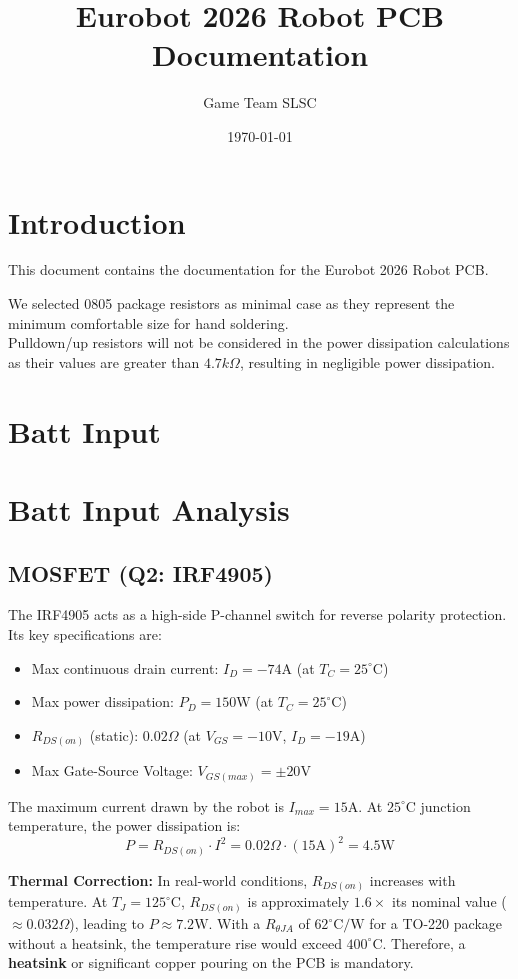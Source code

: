 \documentclass{article}
\title{Eurobot 2026 Robot PCB Documentation}
\author{Game Team SLSC}
\date{\today}
\begin{document}
\maketitle

\section{Introduction}
This document contains the documentation for the Eurobot 2026 Robot PCB.

We selected 0805 package resistors as minimal case as they represent the minimum comfortable size for hand soldering. \\
Pulldown/up resistors will not be considered in the power dissipation calculations as their values are greater than $4.7k\Omega$, resulting in negligible power dissipation.

\section{Batt Input}
\section{Batt Input Analysis}

\subsection{MOSFET (Q2: IRF4905)}
The IRF4905 acts as a high-side P-channel switch for reverse polarity protection. Its key specifications are:
\begin{itemize}
    \item Max continuous drain current: $I_{D} = -74\text{A}$ (at $T_C = 25^\circ\text{C}$)
    \item Max power dissipation: $P_{D} = 150\text{W}$ (at $T_C = 25^\circ\text{C}$)
    \item $R_{DS(on)}$ (static): $0.02\Omega$ (at $V_{GS} = -10\text{V}$, $I_{D} = -19\text{A}$)
    \item Max Gate-Source Voltage: $V_{GS(max)} = \pm 20\text{V}$
\end{itemize}

The maximum current drawn by the robot is $I_{max} = 15\text{A}$. 
At $25^\circ\text{C}$ junction temperature, the power dissipation is:
$$P = R_{DS(on)} \cdot I^2 = 0.02\Omega \cdot (15\text{A})^2 = 4.5\text{W}$$

\textbf{Thermal Correction:} In real-world conditions, $R_{DS(on)}$ increases with temperature. At $T_J = 125^\circ\text{C}$, $R_{DS(on)}$ is approximately $1.6 \times$ its nominal value ($\approx 0.032\Omega$), leading to $P \approx 7.2\text{W}$. 
With a $R_{\theta JA}$ of $62^\circ\text{C/W}$ for a TO-220 package without a heatsink, the temperature rise would exceed $400^\circ\text{C}$. Therefore, a \textbf{heatsink} or significant copper pouring on the PCB is mandatory.
\end{document}
